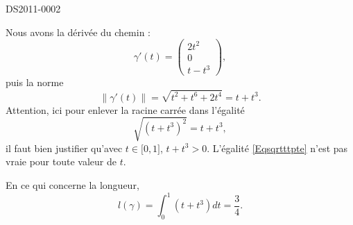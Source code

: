 \begin{corrige}{DS2011-0002}
  
    Nous avons la dérivée du chemin :
    \begin{equation}
        \gamma'(t)=\begin{pmatrix}
            2t^2    \\ 
            0    \\ 
            t-t^3    
        \end{pmatrix},
    \end{equation}
    puis la norme
    \begin{equation}
        \| \gamma'(t) \|=\sqrt{t^2+t^6+2t^4}=t+t^3.
    \end{equation}
    Attention, ici pour enlever la racine carrée dans l'égalité
    \begin{equation}    \label{Eqsqrtttpte}
        \sqrt{(t+t^3)^2}=t+t^3,
    \end{equation}
    il faut bien justifier qu'avec \( t\in\mathopen[ 0 , 1 \mathclose]\), \( t+t^3>0\). L'égalité \eqref{Eqsqrtttpte} n'est pas vraie pour toute valeur de \( t\).

    En ce qui concerne la longueur,
    \begin{equation}
        l(\gamma)=\int_0^1(t+t^3)dt=\frac{ 3 }{ 4 }.
    \end{equation}

\end{corrige}
